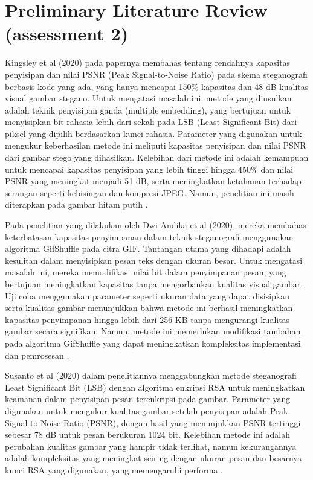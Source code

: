 \documentclass{ittelkom}
\begin{document}
\section{Preliminary Literature Review \color{red}(assessment 2)}
Kingsley et al (2020) pada papernya membahas tentang rendahnya kapasitas penyisipan dan nilai PSNR (Peak Signal-to-Noise Ratio) pada skema steganografi berbasis kode yang ada, yang hanya mencapai 150\% kapasitas dan 48 dB kualitas visual gambar stegano. Untuk mengatasi masalah ini, metode yang diusulkan adalah teknik penyisipan ganda (multiple embedding), yang bertujuan untuk menyisipkan bit rahasia lebih dari sekali pada LSB (Least Significant Bit) dari piksel yang dipilih berdasarkan kunci rahasia. Parameter yang digunakan untuk mengukur keberhasilan metode ini meliputi kapasitas penyisipan dan nilai PSNR dari gambar stego yang dihasilkan. Kelebihan dari metode ini adalah kemampuan untuk mencapai kapasitas penyisipan yang lebih tinggi hingga 450\% dan nilai PSNR yang meningkat menjadi 51 dB, serta meningkatkan ketahanan terhadap serangan seperti kebisingan dan kompresi JPEG. Namun, penelitian ini masih diterapkan pada gambar hitam putih \cite{kingsley2020improving}.

Pada penelitian yang dilakukan oleh Dwi Andika et al (2020), mereka membahas
keterbatasan kapasitas penyimpanan dalam teknik steganografi menggunakan
algoritma GifShuffle pada citra GIF. Tantangan utama yang dihadapi adalah
kesulitan dalam menyisipkan pesan teks dengan ukuran besar. Untuk mengatasi
masalah ini, mereka memodifikasi nilai bit dalam penyimpanan pesan, yang
bertujuan meningkatkan kapasitas tanpa mengorbankan kualitas visual gambar. Uji
coba menggunakan parameter seperti ukuran data yang dapat disisipkan serta
kualitas gambar menunjukkan bahwa metode ini berhasil meningkatkan kapasitas
penyimpanan hingga lebih dari 256 KB tanpa mengurangi kualitas gambar secara
signifikan. Namun, metode ini memerlukan modifikasi tambahan pada algoritma
GifShuffle yang dapat meningkatkan kompleksitas implementasi dan pemrosesan
\cite{andika2020modifikasi}.

Susanto et al (2020) dalam penelitiannya menggabungkan metode steganografi
Least Significant Bit (LSB) dengan algoritma enkripsi RSA untuk meningkatkan
keamanan dalam penyisipan pesan terenkripsi pada gambar. Parameter yang
digunakan untuk mengukur kualitas gambar setelah penyisipan adalah Peak
Signal-to-Noise Ratio (PSNR), dengan hasil yang menunjukkan PSNR tertinggi
sebesar 78 dB untuk pesan berukuran 1024 bit. Kelebihan metode ini adalah
perubahan kualitas gambar yang hampir tidak terlihat, namun kekurangannya
adalah kompleksitas yang meningkat seiring dengan ukuran pesan dan besarnya
kunci RSA yang digunakan, yang memengaruhi performa
\cite{susanto2020kombinasi}.
\end{document}
